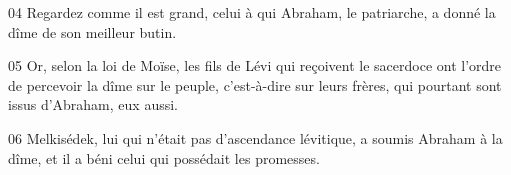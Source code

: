 
04 Regardez comme il est grand, celui à qui Abraham, le patriarche, a donné la dîme de son meilleur butin.

05 Or, selon la loi de Moïse, les fils de Lévi qui reçoivent le sacerdoce ont l’ordre de percevoir la dîme sur le peuple, c’est-à-dire sur leurs frères, qui pourtant sont issus d’Abraham, eux aussi.

06 Melkisédek, lui qui n’était pas d’ascendance lévitique, a soumis Abraham à la dîme, et il a béni celui qui possédait les promesses.
